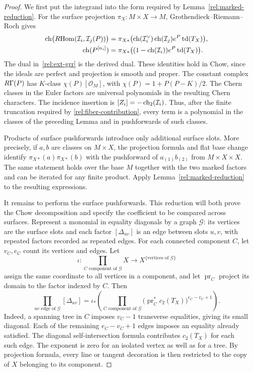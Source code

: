 \begin{proof}
We first put the integrand into the form required by
Lemma~\ref{rel:marked-reduction}.  For the surface projection
$\pi_X:M\times X\to M$, Grothendieck--Riemann--Roch gives
\begin{align}
 \operatorname{ch}\bigl(R\!\operatorname{Hom}(\mathcal I_i,\mathcal I_j(P))\bigr)
 &=\pi_{X*}\bigl(\operatorname{ch}(\mathcal I_i^\vee)
          \operatorname{ch}(\mathcal I_j)e^P\operatorname{td}(T_X)\bigr),
 \label{rel:ext-grr}\\
 \operatorname{ch}(P^{[n_i]})
 &=\pi_{X*}\bigl((1-\operatorname{ch}(\mathcal I_i))e^P\operatorname{td}(T_X)\bigr).
 \label{rel:tautological-grr}
\end{align}
The dual in~\eqref{rel:ext-grr} is the derived dual.  These identities
hold in Chow, since the ideals are perfect and projection is smooth
and proper.  The constant complex $R\Gamma(P)$ has $K$-class
$\chi(P)[\mathcal O_M]$, with
$\chi(P)=1+P(P-K)/2$.  The Chern classes in the Euler factors are
universal polynomials in the resulting Chern characters.  The
incidence insertion is $[Z_i]=-\operatorname{ch}_2(\mathcal I_i)$.
Thus, after the finite truncation required by
\eqref{rel:fiber-contribution}, every term is a polynomial in the
classes of the preceding Lemma and in pushforwards of such classes.

Products of surface pushforwards introduce only additional surface
slots.  More precisely, if $a,b$ are classes on $M\times X$, the
projection formula and flat base change identify
$\pi_{X*}(a)\pi_{X*}(b)$ with the pushforward of
$a_{(1)}b_{(2)}$ from $M\times X\times X$.  The same statement holds
over the base $M$ together with the two marked factors and can be
iterated for any finite product.  Apply
Lemma~\ref{rel:marked-reduction} to the resulting expressions.

It remains to perform the surface pushforwards.  This reduction will
both prove the Chow decomposition and specify the coefficient to be
compared across surfaces.  Represent a monomial in equality diagonals
by a graph $\mathcal G$: its vertices are the surface slots and each
factor $[\Delta_{uv}]$ is an edge between slots $u,v$, with repeated
factors recorded as repeated edges.  For each connected component $C$,
let $v_C,e_C$ count its vertices and edges.  Let
\[
 \iota:\prod_{C\text{ component of }\mathcal G}X
       \longrightarrow X^{\{\text{vertices of }\mathcal G\}}
\]
assign the same coordinate to all vertices in a component, and let
$\operatorname{pr}_C$ project its domain to the factor indexed by $C$.
Then
\begin{equation}\label{rel:graph-intersection}
 \prod_{uv\text{ edge of }\mathcal G}[\Delta_{uv}]
 =\iota_*\left(
    \prod_{C\text{ component of }\mathcal G}
    \bigl(\operatorname{pr}_C^*c_2(T_X)\bigr)^{e_C-v_C+1}
             \right).
\end{equation}
Indeed, a spanning tree in $C$ imposes $v_C-1$ transverse equalities,
giving its small diagonal.  Each of the remaining $e_C-v_C+1$ edges
imposes an equality already satisfied.  The diagonal
self-intersection formula contributes $c_2(T_X)$ for each such edge.
The exponent is zero for an isolated vertex as well as for a tree.
By projection formula, every line or tangent decoration is then
restricted to the copy of $X$ belonging to its component.


\end{proof}
